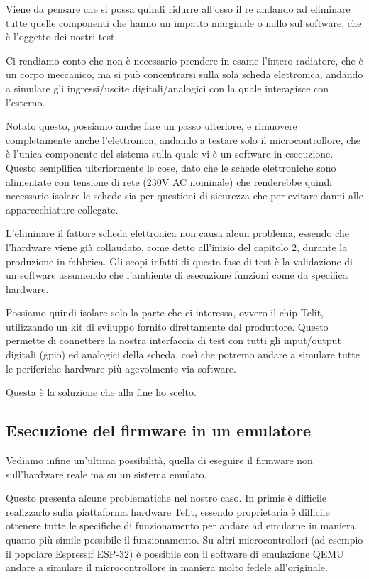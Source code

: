 \documentclass[12pt,a4paper,twoside,titlepage]{book}
\begin{document}
Viene da pensare che si possa quindi ridurre all'osso il \acrshort{re} andando ad eliminare tutte 
quelle componenti che hanno un impatto marginale o nullo sul software, che è l'oggetto dei nostri test. 

Ci rendiamo conto che non è necessario prendere in esame l'intero radiatore, che è un corpo meccanico, 
ma si può concentrarsi sulla sola scheda elettronica, andando a simulare gli ingressi/uscite digitali/analogici
con la quale interagisce con l'esterno. 

Notato questo, possiamo anche fare un passo ulteriore, e rimuovere completamente anche l'elettronica, 
andando a testare solo il microcontrollore, che è l'unica componente del sistema sulla quale vi è un software 
in esecuzione. Questo semplifica ulteriormente le cose, dato che le schede elettroniche sono alimentate 
con tensione di rete (230V AC nominale) che renderebbe quindi necessario isolare le schede sia per questioni 
di sicurezza che per evitare danni alle apparecchiature collegate. 

L'eliminare il fattore scheda elettronica non causa alcun problema, essendo che l'hardware viene già 
collaudato, come detto all'inizio del capitolo 2, durante la produzione in fabbrica. Gli scopi infatti 
di questa fase di test è la validazione di un software assumendo che l'ambiente di esecuzione funzioni 
come da specifica hardware. 

Possiamo quindi isolare solo la parte che ci interessa, ovvero il chip Telit, utilizzando
un kit di sviluppo fornito direttamente dal produttore. Questo permette di connettere
la nostra interfaccia di test con tutti gli input/output digitali (\Gls{gpio}) ed analogici della scheda,
così che potremo andare a simulare tutte le periferiche hardware più agevolmente via software.

Questa è la soluzione che alla fine ho scelto.

\subsection{Esecuzione del firmware in un emulatore}

Vediamo infine un'ultima possibilità, quella di eseguire il \gls{firmware} non sull'hardware
reale ma su un sistema emulato.

Questo presenta alcune problematiche nel nostro caso. In primis è difficile realizzarlo sulla piattaforma 
hardware Telit, essendo proprietaria è difficile ottenere tutte le specifiche di funzionamento per andare
ad emularne in maniera quanto più simile possibile il funzionamento. Su altri microcontrollori (ad esempio 
il popolare Espressif ESP-32) è possibile con il software di emulazione QEMU andare a simulare il microcontrollore 
in maniera molto fedele all'originale. 
\end{document}
